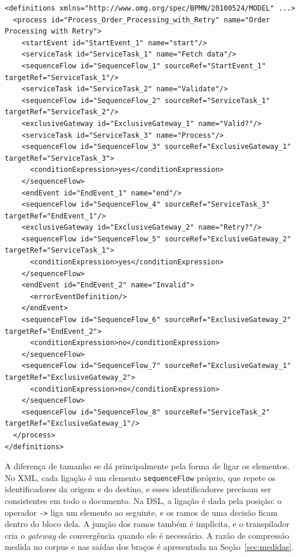 \begin{lstlisting}[float=p,caption={XML gerado pelo transpilador a partir do Código~\ref{lst:dsl}},label={lst:xml},basicstyle=\ttfamily\scriptsize]
<definitions xmlns="http://www.omg.org/spec/BPMN/20100524/MODEL" ...>
  <process id="Process_Order_Processing_with_Retry" name="Order Processing with Retry">
    <startEvent id="StartEvent_1" name="start"/>
    <serviceTask id="ServiceTask_1" name="Fetch data"/>
    <sequenceFlow id="SequenceFlow_1" sourceRef="StartEvent_1" targetRef="ServiceTask_1"/>
    <serviceTask id="ServiceTask_2" name="Validate"/>
    <sequenceFlow id="SequenceFlow_2" sourceRef="ServiceTask_1" targetRef="ServiceTask_2"/>
    <exclusiveGateway id="ExclusiveGateway_1" name="Valid?"/>
    <serviceTask id="ServiceTask_3" name="Process"/>
    <sequenceFlow id="SequenceFlow_3" sourceRef="ExclusiveGateway_1" targetRef="ServiceTask_3">
      <conditionExpression>yes</conditionExpression>
    </sequenceFlow>
    <endEvent id="EndEvent_1" name="end"/>
    <sequenceFlow id="SequenceFlow_4" sourceRef="ServiceTask_3" targetRef="EndEvent_1"/>
    <exclusiveGateway id="ExclusiveGateway_2" name="Retry?"/>
    <sequenceFlow id="SequenceFlow_5" sourceRef="ExclusiveGateway_2" targetRef="ServiceTask_1">
      <conditionExpression>yes</conditionExpression>
    </sequenceFlow>
    <endEvent id="EndEvent_2" name="Invalid">
      <errorEventDefinition/>
    </endEvent>
    <sequenceFlow id="SequenceFlow_6" sourceRef="ExclusiveGateway_2" targetRef="EndEvent_2">
      <conditionExpression>no</conditionExpression>
    </sequenceFlow>
    <sequenceFlow id="SequenceFlow_7" sourceRef="ExclusiveGateway_1" targetRef="ExclusiveGateway_2">
      <conditionExpression>no</conditionExpression>
    </sequenceFlow>
    <sequenceFlow id="SequenceFlow_8" sourceRef="ServiceTask_2" targetRef="ExclusiveGateway_1"/>
  </process>
</definitions>
\end{lstlisting}

A diferença de tamanho se dá principalmente pela forma de ligar os elementos. No XML, cada ligação é um elemento \texttt{sequenceFlow} próprio, que repete os identificadores da origem e do destino, e esses identificadores precisam ser consistentes em todo o documento. Na DSL, a ligação é dada pela posição: o operador \texttt{->} liga um elemento ao seguinte, e os ramos de uma decisão ficam dentro do bloco dela. A junção dos ramos também é implícita, e o transpilador cria o \textit{gateway} de convergência quando ele é necessário. A razão de compressão medida no corpus e nas saídas dos braços é apresentada na Seção~\ref{sec:medidas}.

